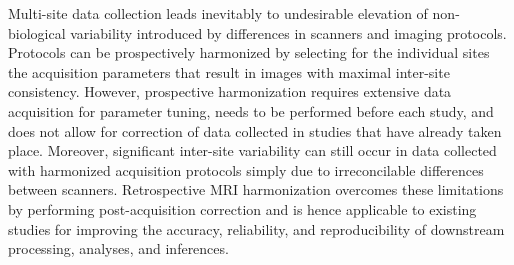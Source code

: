 \documentclass{nature}
\begin{document}
Multi-site data collection leads inevitably to undesirable elevation of non-biological variability introduced by differences in scanners\cite{Shinohara2017Volumetric} and imaging protocols\cite{Pomponio2020Harmonization}. 
Protocols can be prospectively harmonized by selecting for the individual sites the acquisition parameters that result in images with maximal inter-site consistency.
However, prospective harmonization requires extensive data acquisition for parameter tuning, needs to be performed before each study, and does not allow for correction of data collected in studies that have already taken place.
Moreover, significant inter-site variability can still occur in data collected with harmonized acquisition protocols simply due to irreconcilable differences between scanners\cite{Shinohara2017Volumetric}.
Retrospective MRI harmonization\cite{Yu2018Statistical} overcomes these limitations by performing post-acquisition correction and is hence applicable to existing studies for
improving the accuracy, reliability, and reproducibility of downstream processing, analyses, and inferences. 
\end{document}
